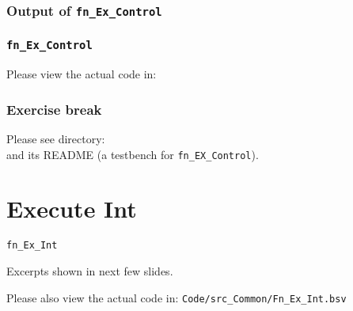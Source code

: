 
\begin{frame}[fragile]
\frametitle{Output of {\tt fn\_Ex\_Control}}

\footnotesize


\end{frame}


\begin{frame}
\frametitle{{\tt fn\_Ex\_Control}}

\footnotesize

\begin{center}\large
 Please view the actual code in: 
\end{center}

\end{frame}


\begin{frame}
\frametitle{\EmojiExercise \hmm Exercise break}

Please see directory:  \\
and its README (a testbench for {\tt fn\_EX\_Control}).

\end{frame}


\section{Execute Int}

\begin{frame}[fragile]

\begin{center}
  {\LARGE\tt fn\_Ex\_Int}

  \vspace{5ex}

  Excerpts shown in next few slides.

  Please also view the actual code in:
  {\tt Code/src\_Common/Fn\_Ex\_Int.bsv}

\end{center}

\end{frame}

